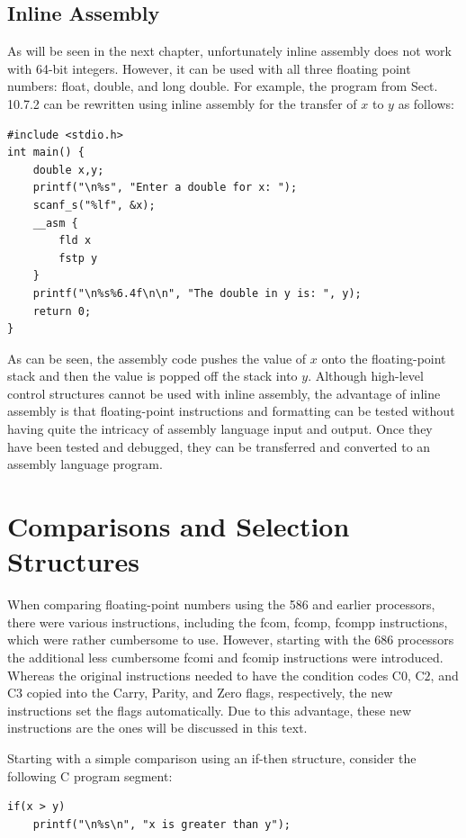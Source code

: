 \documentclass[10pt]{book}
\begin{document}
\subsection{Inline Assembly}
As will be seen in the next chapter, unfortunately inline assembly does not work with 64-bit integers. However, it can be used with all three floating point numbers: float, double, and long double. For example, the program from Sect. 10.7.2 can be rewritten using inline assembly for the transfer of $x$ to $y$ as follows:

\begin{verbatim}
#include <stdio.h>
int main() {
    double x,y;
    printf("\n%s", "Enter a double for x: ");
    scanf_s("%lf", &x);
    __asm {
        fld x
        fstp y
    }
    printf("\n%s%6.4f\n\n", "The double in y is: ", y);
    return 0;
}
\end{verbatim}

As can be seen, the assembly code pushes the value of $x$ onto the floating-point stack and then the value is popped off the stack into $y$. Although high-level control structures cannot be used with inline assembly, the advantage of inline assembly is that floating-point instructions and formatting can be tested without having quite the intricacy of assembly language input and output. Once they have been tested and debugged, they can be transferred and converted to an assembly language program.
\section{Comparisons and Selection Structures}
When comparing floating-point numbers using the 586 and earlier processors, there were various instructions, including the fcom, fcomp, fcompp instructions, which were rather cumbersome to use. However, starting with the 686 processors the additional less cumbersome fcomi and fcomip instructions were introduced. Whereas the original instructions needed to have the condition codes $\mathrm{C}0$, $\mathrm{C}2$, and $\mathrm{C}3$ copied into the Carry, Parity, and Zero flags, respectively, the new instructions set the flags automatically. Due to this advantage, these new instructions are the ones will be discussed in this text.

Starting with a simple comparison using an if-then structure, consider the following C program segment:

\begin{verbatim}
if(x > y)
    printf("\n%s\n", "x is greater than y");
\end{verbatim}
\end{document}

